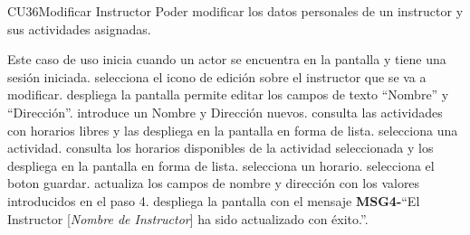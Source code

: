 	\begin{UseCase}{CU36}{Modificar Instructor}{
		Poder modificar los datos personales de un instructor y sus actividades asignadas.
	}
	\end{UseCase}
	\begin{UCtrayectoria}{Este caso de uso inicia cuando un actor se encuentra en la pantalla  y tiene una sesión iniciada.}
		\UCpaso[\UCactor] selecciona el icono de edición sobre el instructor que se va a modificar.
		\UCpaso despliega la pantalla 
		\UCpaso permite editar los campos de texto “Nombre” y “Dirección”.
		\UCpaso[\UCactor] introduce un Nombre y Dirección nuevos.
		\UCpaso consulta las actividades con horarios libres y las despliega en la pantalla en forma de lista.
		\UCpaso[\UCactor] selecciona una actividad.
		\UCpaso consulta los horarios disponibles de la actividad seleccionada y los despliega en la pantalla en forma de lista.
		\UCpaso[\UCactor] selecciona un horario.
		\UCpaso[\UCactor] selecciona el boton guardar.
		\UCpaso actualiza los campos de nombre y dirección con los valores introducidos en el paso 4.
		\UCpaso {}
		\UCpaso despliega la pantalla  con el mensaje {\bf MSG4-}``El Instructor [{\em Nombre de Instructor}] ha sido actualizado con éxito.''.
	\end{UCtrayectoria}

